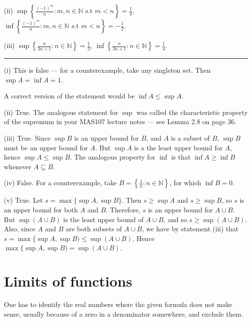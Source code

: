 \documentclass[letterpaper,10pt,english]{jupyterBook}
\begin{document}
\sphinxAtStartPar
(ii) \(\displaystyle\sup\left\{\frac{(-1)^m}{n}:m,n\in\mathbb{N} \text{ s.t } m<n\right\}=\frac{1}{3}\), \(\displaystyle\inf\left\{\frac{(-1)^m}{n}:m,n\in\mathbb{N} \text{ s.t } m<n\right\}=-\frac{1}{2}\).

\sphinxAtStartPar
(iii) \(\displaystyle\sup\left\{\frac{n}{3n + 1} :n\in\mathbb{N}\right\}=\frac{1}{3}\), \(\displaystyle\inf\left\{\frac{n}{3n + 1} :n\in\mathbb{N}\right\}=\frac{1}{4}\).


\bigskip\hrule\bigskip


\sphinxAtStartPar
{\hyperref[\detokenize{Problems:p7}]{}}(i) This is false — for a counter\sphinxhyphen{}example, take any singleton set. Then \(\sup A=\inf A=1\).

\sphinxAtStartPar
A correct version of the statement would be \(\inf A \leq \sup A\).

\sphinxAtStartPar
(ii) True. The analogous statement for \(\sup\) was called the characteristic property of the supremum in your MAS107 lecture notes — see Lemma 2.8 on page 36.

\sphinxAtStartPar
(iii) True. Since \(\sup B\) is an upper bound for \(B\), and \(A\) is a subset of \(B\), \(\sup B\) must be an upper bound for \(A\). But \(\sup A\) is a the least upper bound for \(A\), hence \(\sup A\leq \sup B\). The analogous property for \(\inf\) is that \(\inf A\geq\inf B\) whenever \(A\subseteq B\).

\sphinxAtStartPar
(iv) False. For a counter\sphinxhyphen{}example, take \(B=\left\{\frac{1}{n}:n\in\mathbb{N}\right\}\), for which \(\inf B=0\).

\sphinxAtStartPar
(v) True. Let \(s=\max\{\sup A,\sup B\}\). Then \(s\geq \sup A\) and \(s\geq \sup B\), so \(s\) is an upper bound for both \(A\) and \(B\). Therefore, \(s\) is an upper bound for \(A\cup B\). But \(\sup(A\cup B)\) is the least upper bound of \(A\cup B\), and so \(s\geq\sup(A\cup B)\). Also, since \(A\) and \(B\) are both subsets of \(A\cup B\), we have by statement (iii) that \(s=\max\{\sup A,\sup B)\leq\sup(A\cup B)\). Hence \(\max\{\sup A,\sup B)=\sup(A\cup B)\).


\section{Limits of functions}
\label{\detokenize{Solutions-upto46:limits-of-functions}}\label{\detokenize{Solutions-upto46:ch2sol}}
\sphinxAtStartPar
{\hyperref[\detokenize{Problems:id1}]{}} One has to identify the real numbers where the given formula does not make sense, usually because of a zero in a denominator somewhere, and exclude them.
\end{document}
